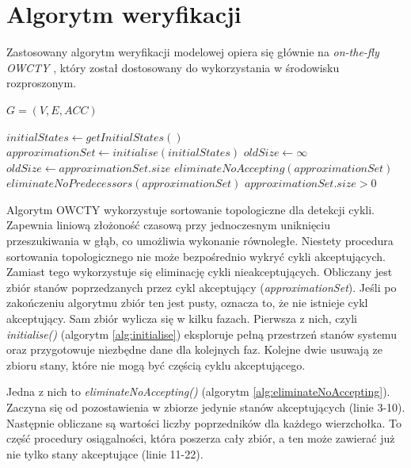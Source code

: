 \chapter{Algorytm weryfikacji} \label{chap:model_checking_algorithm}

Zastosowany algorytm weryfikacji modelowej opiera się głównie na \textit{on-the-fly OWCTY} \cite{Bar12}, który został dostosowany do wykorzystania w środowisku rozproszonym.

\begin{algorithm}
\caption{$ detectAcceptingCycle() $}
\label{alg:detectAcceptingCycle}
\begin{algorithmic}[1]
\REQUIRE $ G = (V,E,ACC) $

\STATE $ initialStates \leftarrow getInitialStates() $
\STATE $ approximationSet \leftarrow initialise(initialStates) $
\STATE $ oldSize \leftarrow \infty $
  \STATE $ oldSize \leftarrow approximationSet.size $
  \STATE $ eliminateNoAccepting(approximationSet) $
  \STATE $ eliminateNoPredecessors(approximationSet) $
\ENDWHILE
\RETURN $ approximationSet.size > 0 $
\end{algorithmic}
\end{algorithm}

Algorytm OWCTY wykorzystuje sortowanie topologiczne dla detekcji cykli.
Zapewnia liniową złożoność czasową przy jednoczesnym uniknięciu przeszukiwania w głąb, co umożliwia wykonanie równoległe.
Niestety procedura sortowania topologicznego nie może bezpośrednio wykryć cykli akceptujących.
Zamiast tego wykorzystuje się eliminację cykli nieakceptujących.
Obliczany jest zbiór stanów poprzedzanych przez cykl akceptujący (\textit{approximationSet}).
Jeśli po zakończeniu algorytmu zbiór ten jest pusty, oznacza  to, że nie istnieje cykl akceptujący.
Sam zbiór wylicza się w kilku fazach.
Pierwsza z nich, czyli \textit{initialise()} (algorytm \ref{alg:initialise}) eksploruje pełną przestrzeń stanów systemu oraz przygotowuje niezbędne dane dla kolejnych faz.
Kolejne dwie usuwają ze zbioru stany, które nie mogą być częścią cyklu akceptującego.

Jedna z nich to \textit{eliminateNoAccepting()} (algorytm \ref{alg:eliminateNoAccepting}).
Zaczyna się od pozostawienia w zbiorze jedynie stanów akceptujących (linie 3-10).
Następnie obliczane są wartości liczby poprzedników dla każdego wierzchołka.
To część procedury osiągalności, która poszerza cały zbiór, a ten może zawierać już nie tylko stany akceptujące (linie 11-22).

